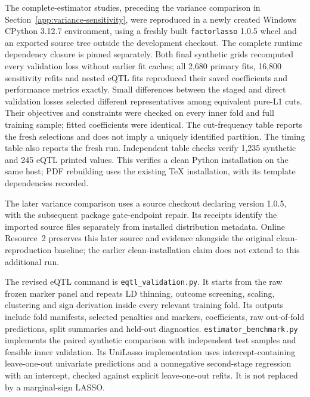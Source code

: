 \documentclass[11pt,a4paper]{article}
\begin{document}
The complete-estimator studies, preceding the variance comparison in
Section~\ref{app:variance-sensitivity}, were reproduced in a newly created Windows
CPython 3.12.7 environment, using a freshly built \texttt{factorlasso} 1.0.5
wheel and an exported source tree outside the development checkout.
The complete runtime dependency closure is pinned separately. Both final
synthetic grids recomputed every validation loss without earlier fit caches;
all 2,680 primary fits, 16,800 sensitivity refits and nested eQTL fits reproduced
their saved coefficients and performance metrics exactly. Small differences
between the staged and direct validation losses selected different representatives
among equivalent pure-L1 cuts. Their objectives and constraints were checked
on every inner fold and full training sample; fitted coefficients were identical.
The cut-frequency table reports the fresh selections and does not imply a
uniquely identified partition. The timing table also reports the fresh run.
Independent table checks verify 1,235 synthetic and 245 eQTL printed values.
This verifies a clean Python installation on the same host; PDF rebuilding
uses the existing TeX installation, with its template dependencies recorded.

The later variance comparison uses a source checkout declaring version 1.0.5,
with the subsequent package gate-endpoint repair. Its receipts identify the
imported source files separately from installed distribution metadata.
Online Resource~2 preserves this later source and evidence alongside the
original clean-reproduction baseline; the earlier clean-installation claim
does not extend to this additional run.

The revised eQTL command is \nolinkurl{eqtl_validation.py}. It starts from the
raw frozen marker panel and repeats LD thinning, outcome screening, scaling,
clustering and sign derivation inside every relevant training fold. Its outputs
include fold manifests, selected penalties and markers, coefficients, raw
out-of-fold predictions, split summaries and held-out diagnostics.
\nolinkurl{estimator_benchmark.py} implements the paired synthetic comparison
with independent test samples and feasible inner validation. Its UniLasso
implementation uses intercept-containing leave-one-out univariate predictions
and a nonnegative second-stage regression with an intercept, checked against
explicit leave-one-out refits. It is not replaced by a marginal-sign LASSO.
\end{document}
